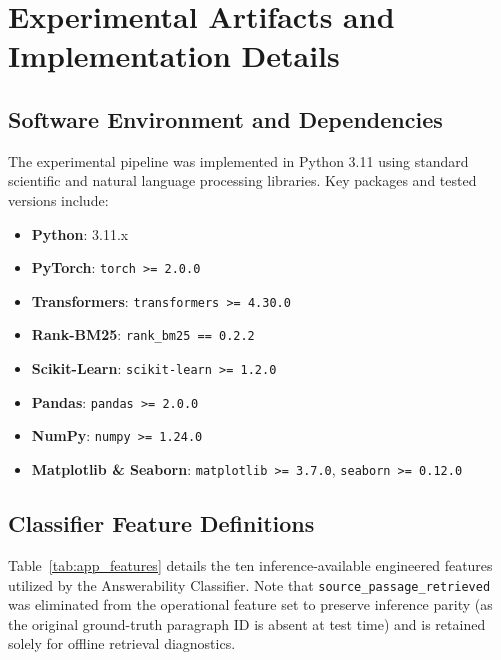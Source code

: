 \chapter{Experimental Artifacts and Implementation Details}
\label{app:artifacts}

\section{Software Environment and Dependencies}
\label{sec:app_env}

The experimental pipeline was implemented in Python 3.11 using standard scientific and natural language processing libraries. Key packages and tested versions include:

\begin{itemize}
  \item \textbf{Python}: 3.11.x
  \item \textbf{PyTorch}: \texttt{torch >= 2.0.0}
  \item \textbf{Transformers}: \texttt{transformers >= 4.30.0}
  \item \textbf{Rank-BM25}: \texttt{rank\_bm25 == 0.2.2}
  \item \textbf{Scikit-Learn}: \texttt{scikit-learn >= 1.2.0}
  \item \textbf{Pandas}: \texttt{pandas >= 2.0.0}
  \item \textbf{NumPy}: \texttt{numpy >= 1.24.0}
  \item \textbf{Matplotlib \& Seaborn}: \texttt{matplotlib >= 3.7.0}, \texttt{seaborn >= 0.12.0}
\end{itemize}

\section{Classifier Feature Definitions}
\label{sec:app_features}

Table~\ref{tab:app_features} details the ten inference-available engineered features utilized by the Answerability Classifier. Note that \texttt{source\_passage\_retrieved} was eliminated from the operational feature set to preserve inference parity (as the original ground-truth paragraph ID is absent at test time) and is retained solely for offline retrieval diagnostics.

